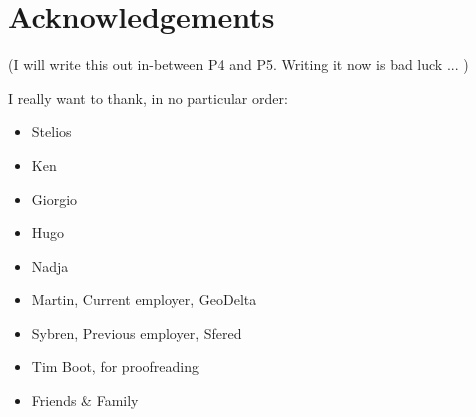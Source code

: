 
\chapter*{Acknowledgements}
(I will write this out in-between P4 and P5. Writing it now is bad luck ... )

I really want to thank, in no particular order:
\begin{itemize}
    \item Stelios
    \item Ken
    \item Giorgio
    \item Hugo
    \item Nadja
    \item Martin, Current employer, GeoDelta 
    \item Sybren, Previous employer, Sfered
    \item Tim Boot, for proofreading
    \item Friends \& Family
\end{itemize}



 